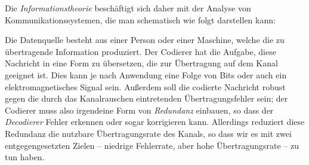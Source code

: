 Die \emph{Informationstheorie} beschäftigt sich daher mit der Analyse von Kommunikationssystemen, die man schematisch wie folgt darstellen kann:
\begin{Center}
\end{Center}
Die Datenquelle besteht aus einer Person oder einer Maschine, welche die zu übertragende Information produziert. Der Codierer hat die Aufgabe, diese Nachricht in eine Form zu übersetzen, die zur Übertragung auf dem Kanal geeignet ist. Dies kann je nach Anwendung \zB eine Folge von Bits oder auch ein elektromagnetisches Signal sein. Außerdem soll die codierte Nachricht robust gegen die durch das Kanalrauschen eintretenden Übertragungsfehler sein; der Codierer muss also irgendeine Form von \emph{Redundanz} einbauen, so dass der \emph{Decodierer} Fehler erkennen oder sogar korrigieren kann. Allerdings reduziert diese Redundanz die nutzbare Übertragungsrate des Kanals, so dass wir es mit zwei entgegengesetzten Zielen – niedrige Fehlerrate, aber hohe Übertragungsrate – zu tun haben.


